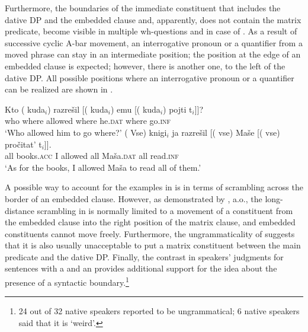 \documentclass[output=paper,colorlinks,citecolor=brown,newtxmath]{langsci/langscibook}
\begin{document}
Furthermore, the boundaries of the immediate constituent that includes the dative DP and the embedded clause and, apparently, does not contain the {matrix predicate}, become visible in multiple wh-questions and in case of . As a result of successive cyclic A-bar movement, an interrogative {pronoun} or a {quantifier} from a moved phrase can stay in an intermediate position; the position at the edge of an embedded clause is expected; however, there is another one, to the left of the {dative} DP. All possible positions where an interrogative {pronoun} or a {quantifier} can be realized are shown in .

\begin{exe}
\ex\label{ex7} \begin{xlist}
\ex\label{ex7a}
\gll Kto (\hspace{-2pt} kuda$_i$) razrešil 	[(\hspace{-2pt} kuda$_i$) emu [(\hspace{-2pt} kuda$_i$) pojti t$_i$]]?\\
    who {} where allowed {} where he.\textsc{dat} {} where go.\textsc{inf}\\
\glt `Who allowed him to go where?'
\ex\label{ex7b}
\gll (\hspace{-2pt} Vse) knigi$_i$ ja razrešil [(\hspace{-2pt} vse) Maše [(\hspace{-2pt} vse) pročitat’ t$_i$]].\\
    {} all books.\textsc{acc} I allowed {} all Maša.\textsc{dat} {} all read.\textsc{inf}\\
\glt `As for the books, I allowed Maša to read all of them.'
    \end{xlist}
\end{exe}

\noindent A possible way to account for the examples in  is in terms of scrambling across the border of an embedded clause. However, as demonstrated by \cite{Bailyn2003}, a.o., the long-distance scrambling in  is normally limited to a movement of a constituent from the embedded clause into the right  position of the matrix clause, and embedded constituents cannot move freely. Furthermore, the ungrammaticality of  suggests that it is also usually unacceptable to put a matrix constituent between the main predicate and the dative DP. Finally, the contrast in speakers’ judgments for sentences with a   and an   provides additional support for the idea about the presence of a syntactic boundary.\footnote{24 out of 32 native speakers reported  to be ungrammatical; 6 native speakers said that it is `weird’.}
\end{document}
